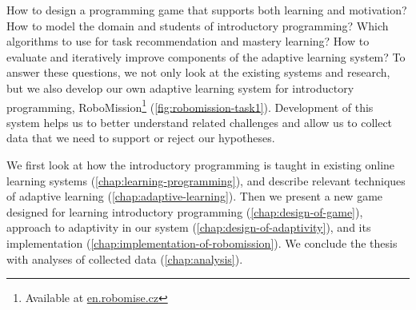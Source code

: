 
How to design a programming game that supports both learning and motivation?
How to model the domain and students of introductory programming?
Which algorithms to use for task recommendation and mastery learning?
How to evaluate and iteratively improve components of the adaptive learning system?
To answer these questions, we not only look at the existing systems
and research, but we also develop our own adaptive learning system for
introductory programming, RoboMission\footnote{Available at \url{en.robomise.cz}}
(\cref{fig:robomission-task1}).
Development of this system helps us to better understand related challenges
and allow us to collect data that we need to support or reject our hypotheses.


We first look at how the introductory programming is taught
in existing online learning systems
(\cref{chap:learning-programming}),
and describe relevant techniques of adaptive learning
(\cref{chap:adaptive-learning}).
Then we present a new game designed for learning introductory programming
(\cref{chap:design-of-game}),
approach to adaptivity in our system (\cref{chap:design-of-adaptivity}),
and its implementation (\cref{chap:implementation-of-robomission}).
We conclude the thesis with analyses of collected data
(\cref{chap:analysis}).
